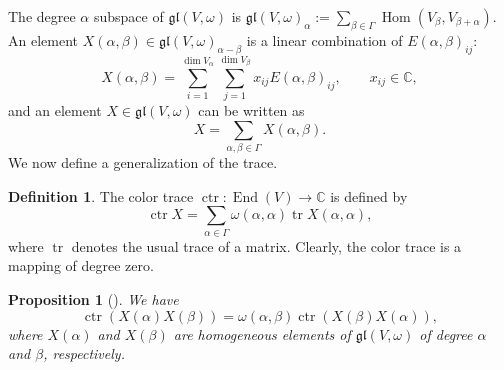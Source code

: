 \documentclass[pdftex]{sigma}
\numberwithin{equation}{section}
\newtheorem{Proposition}[Theorem]{Proposition}
\theoremstyle{definition}
\newtheorem{Definition}[Theorem]{Definition}
\def\gl{\mathfrak{gl}}
\begin{document}
The degree $\alpha$ subspace of $\gl(V,\omega)$ is
$ \gl(V,\omega)_{\alpha} := \sum_{\beta \in \Gamma} \operatorname{Hom}(V_{\beta}, V_{\beta+\alpha}).$
An element $ X(\alpha,\beta) \in \gl(V,\omega)_{\alpha-\beta}$ is a linear combination of $E(\alpha,\beta)_{ij}$:
\begin{equation*}
	X(\alpha,\beta) = \sum_{i=1}^{\dim V_\alpha} \sum_{j=1}^{\dim V_\beta} x_{ij} E(\alpha,\beta)_{ij}, \qquad x_{ij} \in \mathbb{C},
\end{equation*}
and an element $ X \in \gl(V,\omega)$ can be written as
\begin{equation*}
	X = \sum_{\alpha,\beta\in \Gamma} X(\alpha,\beta).
\end{equation*}
We now define a generalization of the trace.

\begin{Definition}
	The color trace $\operatorname{ctr}\colon \operatorname{End}(V) \to \mathbb{C}$ is defined by
	\begin{equation*}
		\operatorname{ctr} X = \sum_{\alpha \in \Gamma} \omega(\alpha,\alpha) \operatorname{tr} X(\alpha,\alpha),
	\end{equation*}
	where $\operatorname{tr}$ denotes the usual trace of a matrix. Clearly, the color trace is a mapping of degree zero.
\end{Definition}
%
\begin{Proposition}[\cite{scheuTen,zhang2025}] We have
	\begin{equation}
		\operatorname{ctr}(X(\alpha) X(\beta)) = \omega(\alpha,\beta) \operatorname{ctr}(X(\beta) X(\alpha)),
		\label{ctrperm}
	\end{equation}
	where $ X(\alpha)$ and $ X(\beta) $ are homogeneous elements of $\gl(V,\omega)$ of degree $\alpha$ and $\beta$, respectively.
\end{Proposition}
\end{document}
